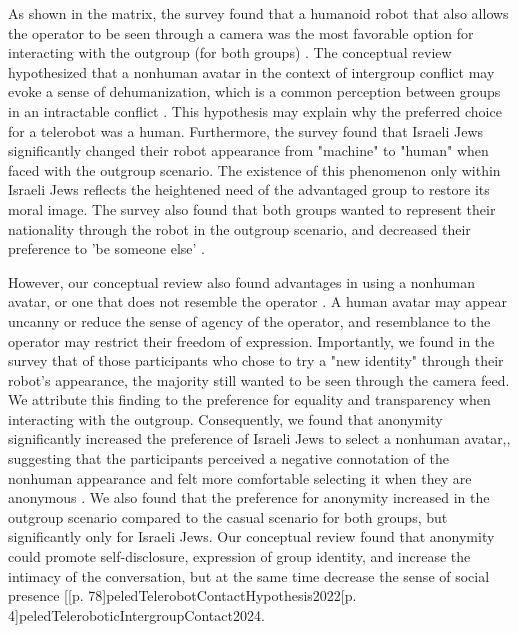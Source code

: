 \documentclass[dissertation,math,vertlayout,pdfa,colorlinks]{aaltoseries}
\makeatletter
\newcommand{\citecomment}[2][]{\citen{#2}#1\citevar}
\newcommand{\citeone}[1]{\citecomment{#1}}
\newcommand{\citetwo}[2][]{\citecomment[,~#1]{#2}}
\newcommand{\citevar}{\@ifnextchar\bgroup{;~\citeone}{\@ifnextchar[{;~\citetwo}{]}}}
\newcommand{\citefirst}{\@ifnextchar\bgroup{\citeone}{\@ifnextchar[{\citetwo}{]}}}
\newcommand{\cites}{[\citefirst}
\makeatother
\begin{document}
As shown in the matrix, the survey found that a humanoid robot that also allows the operator to be seen through a camera was the most favorable option for interacting with the outgroup (for both groups) \cite[p. 11]{peledTeleroboticIntergroupContact2024}. The conceptual review hypothesized that a nonhuman avatar in the context of intergroup conflict may evoke a sense of dehumanization, which is a common perception between groups in an intractable conflict \cite[p. 79]{peledTelerobotContactHypothesis2022}. This hypothesis may explain why the preferred choice for a telerobot was a human. Furthermore, the survey found that Israeli Jews significantly changed their robot appearance from "machine" to "human" when faced with the outgroup scenario. The existence of this phenomenon only within Israeli Jews reflects the heightened need of the advantaged group to restore its moral image. The survey also found that both groups wanted to represent their nationality through the robot in the outgroup scenario, and decreased their preference to 'be someone else' \cite[p. 11]{peledTeleroboticIntergroupContact2024}.

However, our conceptual review also found advantages in using a nonhuman avatar, or one that does not resemble the operator \cite[p. 81]{peledTelerobotContactHypothesis2022}. A human avatar may appear uncanny or reduce the sense of agency of the operator, and resemblance to the operator may restrict their freedom of expression. Importantly, we found in the survey that of those participants who chose to try a "new identity" through their robot's appearance, the majority still wanted to be seen through the camera feed. We attribute this finding to the preference for equality and transparency when interacting with the outgroup. Consequently, we found that anonymity significantly increased the preference of Israeli Jews to select a nonhuman avatar,\cite[p. 11]{peledTeleroboticIntergroupContact2024}, suggesting that the participants perceived a negative connotation of the nonhuman appearance and felt more comfortable selecting it when they are anonymous \cite[p. 4]{peledTeleroboticIntergroupContact2024}. We also found that the preference for anonymity increased in the outgroup scenario compared to the casual scenario for both groups, but significantly only for Israeli Jews. Our conceptual review found that anonymity could promote self-disclosure, expression of group identity, and increase the intimacy of the conversation, but at the same time decrease the sense of social presence \cites[p. 78]{peledTelerobotContactHypothesis2022}[p. 4]{peledTeleroboticIntergroupContact2024}.
\end{document}
